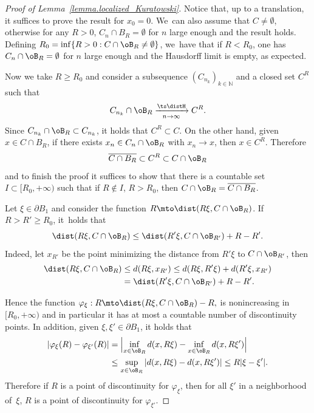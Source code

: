 \begin{proof}[Proof of Lemma~\ref{lemma.localized_Kuratowski}]
Notice that, up to a translation, it suffices to prove the result for $x_0 = 0$. We~can also assume that $C\neq\emptyset$, otherwise
for any $R>0$, $C_n\cap B_R=\emptyset$ for $n$ large enough and the result holds.
Defining $R_0=\inf\{R>0: C\cap \oB_R\neq\emptyset\}$, we~have that if $R<R_0$,
one has $C_n\cap \oB_{R}=\emptyset$ for $n$ large enough
and the Hausdorff limit is empty, as expected.

Now we take $R\ge R_0$ and consider a subsequence $\left(C_{n_k}\right)_{k \in \mathbb{N}}$ and a closed set $C^R$ such that
\[
C_{n_k}\cap \oB_R \xrightarrow[n \to \infty]{\ts\distH} C^R.
\]
Since $C_{n_k}\cap\oB_R\subset C_{n_k}$, it holds that $C^R\subset C$.
On the other hand, given $x\in C \cap B_R$, if there exists $x_n\in C_n \cap \oB_R$
with $x_n\to x$, then $x\in C^R$.
Therefore
\[
\overline{C\cap B_R}\subset C^R\subset C\cap\oB_R
\]
and to finish the proof it suffices to show that there is a countable set $I\subset [R_0,+\infty)$ such that
if $R\not\in I$, $R>R_0$, then $C\cap\oB_R =
\overline{C\cap B_R}$.

Let $\xi\in \partial B_1$ and consider the function
$R\mto \dist(R\xi,C\cap \oB_R)$. If $R>R'\ge R_0$, it~holds that
\[
\dist(R\xi,C\cap \oB_R)
\le \dist(R'\xi,C\cap \oB_{R'})+R-R'.
\]
Indeed, let $x_{R'}$ be the point minimizing the distance from $R'\xi$ to $C\cap \oB_{R'}$, then
\begin{align*}
\dist(R\xi, C\cap \oB_R)
&\le
d(R\xi, x_{R'})
\le
d(R\xi, R'\xi) + d(R'\xi, x_{R'}) \\
&=
\dist(R'\xi, C\cap \oB_{R'}) + R - R'.
\end{align*}

Hence the function
$
\varphi_\xi : R \mto \dist(R\xi,C\cap \oB_R)-R,
$
is nonincreasing in $[R_0,+\infty)$ and in particular it has at
most a countable number of discontinuity points. In addition, given $\xi,\xi'\in\partial B_1$, it holds that
\begin{align*}
\left|
\varphi_\xi(R) - \varphi_{\xi'}(R)
\right|
&=
\Bigl|
\inf_{x \in \oB_R} d(x, R\xi) - \inf_{x \in \oB_R} d(x, R\xi')
\Bigr|\\
&\le
\sup_{x \in \oB_R}
\left|
d(x, R\xi) - d(x, R\xi')
\right|
\le R|\xi - \xi'|.
\end{align*}
Therefore if $R$ is a point of discontinuity for $\varphi_\xi$, then
for all $\xi'$ in a neighborhood of~$\xi$, $R$ is a point
of discontinuity for $\varphi_{\xi'}$.


\end{proof}
